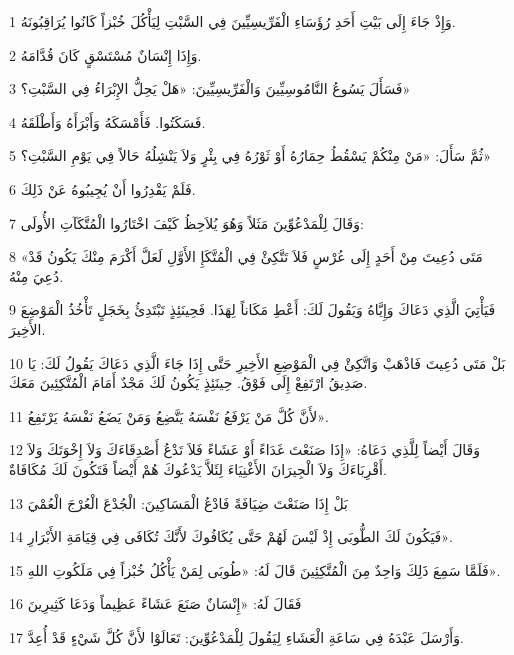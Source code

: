 \par 1 وَإِذْ جَاءَ إِلَى بَيْتِ أَحَدِ رُؤَسَاءِ الْفَرِّيسِيِّينَ فِي السَّبْتِ لِيَأْكُلَ خُبْزاً كَانُوا يُرَاقِبُونَهُ.
\par 2 وَإِذَا إِنْسَانٌ مُسْتَسْقٍ كَانَ قُدَّامَهُ.
\par 3 فَسَأَلَ يَسُوعُ النَّامُوسِيِّينَ وَالْفَرِّيسِيِّينَ: «هَلْ يَحِلُّ الإِبْرَاءُ فِي السَّبْتِ؟»
\par 4 فَسَكَتُوا. فَأَمْسَكَهُ وَأَبْرَأَهُ وَأَطْلَقَهُ.
\par 5 ثُمَّ سَأَلَ: «مَنْ مِنْكُمْ يَسْقُطُ حِمَارُهُ أَوْ ثَوْرُهُ فِي بِئْرٍ وَلاَ يَنْشِلُهُ حَالاً فِي يَوْمِ السَّبْتِ؟»
\par 6 فَلَمْ يَقْدِرُوا أَنْ يُجِيبُوهُ عَنْ ذَلِكَ.
\par 7 وَقَالَ لِلْمَدْعُوِّينَ مَثَلاً وَهُوَ يُلاَحِظُ كَيْفَ اخْتَارُوا الْمُتَّكَآتِ الأُولَى:
\par 8 «مَتَى دُعِيتَ مِنْ أَحَدٍ إِلَى عُرْسٍ فَلاَ تَتَّكِئْ فِي الْمُتَّكَإِ الأَوَّلِ لَعَلَّ أَكْرَمَ مِنْكَ يَكُونُ قَدْ دُعِيَ مِنْهُ.
\par 9 فَيَأْتِيَ الَّذِي دَعَاكَ وَإِيَّاهُ وَيَقُولَ لَكَ: أَعْطِ مَكَاناً لِهَذَا. فَحِينَئِذٍ تَبْتَدِئُ بِخَجَلٍ تَأْخُذُ الْمَوْضِعَ الأَخِيرَ.
\par 10 بَلْ مَتَى دُعِيتَ فَاذْهَبْ وَاتَّكِئْ فِي الْمَوْضِعِ الأَخِيرِ حَتَّى إِذَا جَاءَ الَّذِي دَعَاكَ يَقُولُ لَكَ: يَا صَدِيقُ ارْتَفِعْ إِلَى فَوْقُ. حِينَئِذٍ يَكُونُ لَكَ مَجْدٌ أَمَامَ الْمُتَّكِئِينَ مَعَكَ.
\par 11 لأَنَّ كُلَّ مَنْ يَرْفَعُ نَفْسَهُ يَتَّضِعُ وَمَنْ يَضَعُ نَفْسَهُ يَرْتَفِعُ».
\par 12 وَقَالَ أَيْضاً لِلَّذِي دَعَاهُ: «إِذَا صَنَعْتَ غَدَاءً أَوْ عَشَاءً فَلاَ تَدْعُ أَصْدِقَاءَكَ وَلاَ إِخْوَتَكَ وَلاَ أَقْرِبَاءَكَ وَلاَ الْجِيرَانَ الأَغْنِيَاءَ لِئَلاَّ يَدْعُوكَ هُمْ أَيْضاً فَتَكُونَ لَكَ مُكَافَاةٌ.
\par 13 بَلْ إِذَا صَنَعْتَ ضِيَافَةً فَادْعُ الْمَسَاكِينَ: الْجُدْعَ الْعُرْجَ الْعُمْيَ
\par 14 فَيَكُونَ لَكَ الطُّوبَى إِذْ لَيْسَ لَهُمْ حَتَّى يُكَافُوكَ لأَنَّكَ تُكَافَى فِي قِيَامَةِ الأَبْرَارِ».
\par 15 فَلَمَّا سَمِعَ ذَلِكَ وَاحِدٌ مِنَ الْمُتَّكِئِينَ قَالَ لَهُ: «طُوبَى لِمَنْ يَأْكُلُ خُبْزاً فِي مَلَكُوتِ اللهِ».
\par 16 فَقَالَ لَهُ: «إِنْسَانٌ صَنَعَ عَشَاءً عَظِيماً وَدَعَا كَثِيرِينَ
\par 17 وَأَرْسَلَ عَبْدَهُ فِي سَاعَةِ الْعَشَاءِ لِيَقُولَ لِلْمَدْعُوِّينَ: تَعَالَوْا لأَنَّ كُلَّ شَيْءٍ قَدْ أُعِدَّ.
